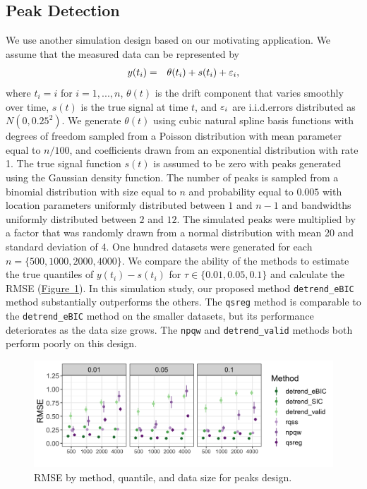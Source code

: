 \documentclass[12pt]{article}
\newcommand{\Fig}[1]{\hyperref[fig:#1]{Figure~\ref*{fig:#1}}} %
\newcommand{\Fig}[1]{{Figure~\ref{fig:#1}}} %
\newcommand{\VE}[2]{\MakeLowercase{#1}_{#2}} %
\begin{document}
\subsection{Peak Detection}
	We use another simulation design based on our motivating application. We assume that the measured data can be represented by 
	\begin{eqnarray*}
	y(t_i) & = & \theta(t_i) + s(t_i) + \VE{\varepsilon}{i},
	\end{eqnarray*}  
	where $t_i = i$ for $i = 1, ..., n$, $\theta(t)$ is the drift component that varies smoothly over time, $s(t)$ is the true signal at time $t$, and $\VE{\varepsilon}{i}$ are i.i.d.\@ errors distributed as $N(0, 0.25^2)$. We generate $\theta(t)$ using cubic natural spline basis functions with degrees of freedom sampled from a Poisson distribution with mean parameter equal to $n/100$,  and coefficients drawn from an exponential distribution with rate 1. The true signal function $s(t)$ is assumed to be zero with peaks generated using the Gaussian density function. The number of peaks is sampled from a binomial distribution with size equal to $n$ and probability equal to $0.005$ with location parameters uniformly distributed between $1$ and $n-1$ and bandwidths uniformly distributed between $2$ and $12$. The simulated peaks were multiplied by a factor that was randomly drawn from a normal distribution with mean 20 and standard deviation of 4. One hundred datasets were generated for each $n=\{500, 1000, 2000, 4000\}$. We compare the ability of the methods to estimate the true quantiles of $y(t_i)-s(t_i)$  for $\tau \in \{0.01, 0.05, 0.1\}$ and calculate the RMSE (\Fig{peaks_rmse}). In this simulation study, our proposed method \texttt{detrend\_eBIC} method substantially outperforms the others. The \texttt{qsreg} method is comparable to the \texttt{detrend\_eBIC} method on the smaller datasets, but its performance deteriorates as the data size grows. The \texttt{npqw} and \texttt{detrend\_valid} methods both perform poorly on this design. 
	
	\begin{figure}
		\includegraphics[width = \linewidth]{Figures/peaks_mse.png}	
		\caption{RMSE by method, quantile, and data size for peaks design.}
		\label{fig:peaks_rmse}
	\end{figure}
	
\end{document}
